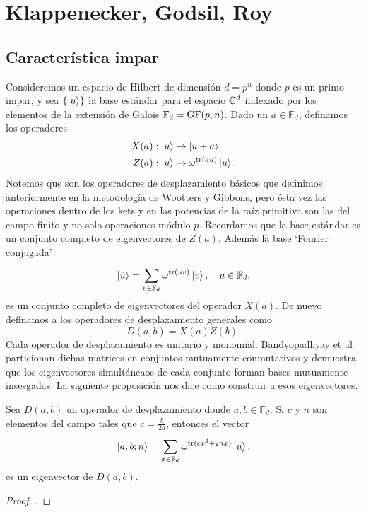   \section{Klappenecker, Godsil, Roy}

  \subsection{Característica impar}

  Consideremos un espacio de Hilbert de dimensión $d =
  p^{n}$ donde $p$ es un primo impar, y sea $\{\ket{u}\}$ la
  base estándar para el espacio $\operatorname{\mathbb{C}}^{d}$ indexado por los
  elementos de la extensión de Galois $\mathbb F_{d} =
  \operatorname{GF}(p,n)$. Dado un $a \in \mathbb F_d$, definamos los
  operadores
  \begin{align}
    X(a) &: \ket u \mapsto \ket{u+a} \\
    Z(a) &: \ket u \mapsto \omega^{\operatorname{tr}(au)} \ket{u}.
  \end{align}
  Notemos que son los operadores de desplazamiento básicos
  que definimos anteriormente en la metodología de Wootters
  y Gibbons, pero ésta vez las operaciones dentro de los
  kets y en las potencias de la raíz primitiva son las del
  campo finito y no solo operaciones módulo $p$. Recordamos
  que la base estándar es un conjunto completo de
  eigenvectores de $Z(a)$. Además la base `Fourier
  conjugada'
  \[
    \ket{\tilde u}
    = \sum_{v \in \mathbb F_d}^{} \omega^{\operatorname{tr}(uv)} \ket{v},
    \quad u \in \mathbb F_d,
  \] 
  es un conjunto completo de eigenvectores del operador
  $X(a)$. De nuevo definamos a los operadores de
  desplazamiento generales como
  \[
    D(a,b) = X(a)Z(b).
  \] 
  Cada operador de desplazamiento es unitario y monomial.
  Bandyopadhyay et al particionan dichas matrices en
  conjuntos mutuamente conmutativos y demuestra que los
  eigenvectores simultáneaos de cada conjunto forman bases
  mutuamente insesgadas. La siguiente proposición nos dice
  como construir a esos eigenvectores.
  \begin{proposition}
    Sea $D(a,b)$ un operador de desplazamiento donde $a,b
    \in \mathbb F_d$. Si $c$ y $n$ son elementos del campo
    tales que $c = \frac{b}{2a}$, entonces el vector
    \begin{equation}
      \ket{a,b; n}
      = \sum_{x \in \mathbb F_d}^{} \omega^{\operatorname{tr}(cx^2+2nx)}
      \ket{u},
    \end{equation}
    es un eigenvector de $D(a,b)$.
  \end{proposition}
  \begin{proof}
    .
  \end{proof}

